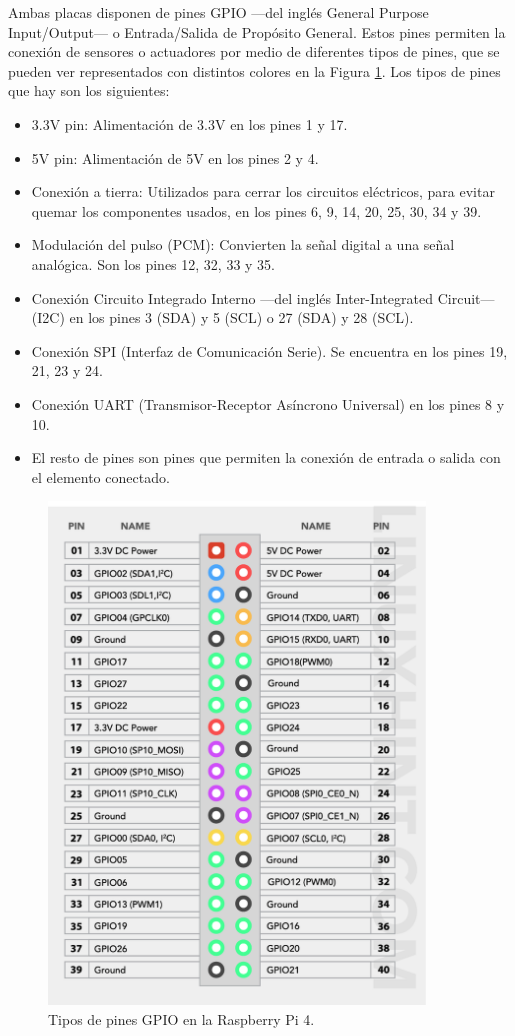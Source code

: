 Ambas placas disponen de pines GPIO ---del inglés General Purpose Input/Output--- o Entrada/Salida de Propósito General. Estos pines permiten la conexión de sensores o actuadores por medio de diferentes tipos de pines, que se pueden ver representados con distintos colores en la Figura \ref{fig:pinout}. Los tipos de pines que hay son los siguientes:
\begin{itemize}
\item 3.3V pin: Alimentación de 3.3V en los pines 1 y 17.
\item 5V pin: Alimentación de 5V en los pines 2 y 4.
\item Conexión a tierra: Utilizados para cerrar los circuitos eléctricos, para evitar quemar los componentes usados, en los pines 6, 9, 14, 20, 25, 30, 34 y 39.
\item Modulación del pulso (PCM): Convierten la señal digital a una señal analógica. Son los pines 12, 32, 33 y 35.
\item Conexión Circuito Integrado Interno ---del inglés Inter-Integrated Circuit--- (I2C) en los pines 3 (SDA) y 5 (SCL) o 27 (SDA) y 28 (SCL).
\item Conexión SPI (Interfaz de Comunicación Serie). Se encuentra en los pines 19, 21, 23 y 24.
\item Conexión UART (Transmisor-Receptor Asíncrono Universal) en los pines 8 y 10.
\item El resto de pines son pines que permiten la conexión de entrada o salida con el elemento conectado.
\end{itemize}

\begin{figure} [h!]
  \begin{center}
    \includegraphics[width=10cm]{figs/pinout}
  \end{center}
  \caption{Tipos de pines GPIO en la Raspberry Pi 4.}
  \label{fig:pinout}
\end{figure}


